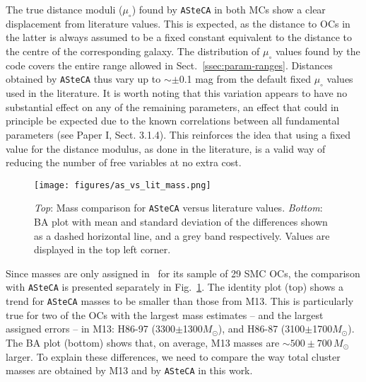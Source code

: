 \documentclass[a4paper,fleqn,usenatbib]{mnras}
\begin{document}
The true distance moduli ($\mu_{\circ}$) found by \texttt{ASteCA} in both MCs
show a clear displacement from literature values. This is expected, as the
distance to OCs in the latter is always assumed to be a fixed constant
equivalent to the
distance to the centre of the corresponding galaxy.
The distribution of $\mu_{\circ}$ values found by the code covers the entire
range allowed in Sect.~\ref{ssec:param-ranges}. Distances obtained by \texttt
{ASteCA} thus vary up to $\sim\pm$0.1 mag from the default fixed $\mu_{\circ}$
values used in the literature.
%
It is worth noting that this variation appears to have no substantial effect on
any of the remaining parameters, an effect that could in principle be expected
due to the known correlations between all fundamental parameters (see Paper I,
Sect. 3.1.4).
This reinforces the idea that using a fixed value for the distance modulus, as
done in the literature, is a valid way of reducing the number of free variables
at no extra cost.\\

\begin{figure}
\texttt{[image: figures/as\_vs\_lit\_mass.png]}
\caption{\emph{Top}: Mass comparison for \texttt{ASteCA} versus literature
values.
\emph{Bottom}: BA plot with mean and standard deviation of the differences
shown as a dashed horizontal line, and a grey band respectively. Values are
displayed in the top left corner.}
\label{fig:as_vs_lit_mass}
\end{figure}

Since masses are only assigned in~\citet[][M13]{Maia_2013} for its sample of 29
SMC OCs, the comparison with \texttt{ASteCA} is presented separately in
Fig.~\ref{fig:as_vs_lit_mass}.
%
The identity plot (top) shows a trend for \texttt{ASteCA} masses to be smaller
than those from M13. This is particularly true for two of the OCs with
the largest mass estimates -- and the largest assigned errors -- in M13:
H86-97 (3300$\pm$1300$M_{\odot}$), and H86-87
(3100$\pm$1700$M_{\odot}$). The BA plot (bottom) shows that, on average, M13
masses are ${\sim}500{\pm}700\,M_{\odot}$ larger.
%
To explain these differences, we need to compare the way total cluster masses
are obtained by M13 and by \texttt{ASteCA} in this work.
\end{document}
